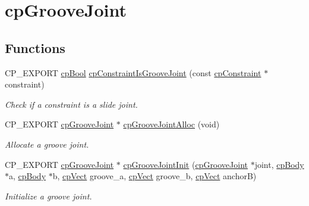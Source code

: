\hypertarget{group__cpGrooveJoint}{}\section{cp\+Groove\+Joint}
\label{group__cpGrooveJoint}
\subsection*{Functions}
\begin{DoxyCompactItemize}
\item 
\mbox{\label{group__cpGrooveJoint_ga0b3250fa615962f7d9f532dda991af44}} 
C\+P\+\_\+\+E\+X\+P\+O\+RT \hyperlink{group__basicTypes_gabc5e752c48f3449ca26ef413ecbd647e}{cp\+Bool} \hyperlink{group__cpGrooveJoint_ga0b3250fa615962f7d9f532dda991af44}{cp\+Constraint\+Is\+Groove\+Joint} (const \hyperlink{structcpConstraint}{cp\+Constraint} $\ast$constraint)
\begin{DoxyCompactList}\small\item\em Check if a constraint is a slide joint. \end{DoxyCompactList}\item 
\mbox{\label{group__cpGrooveJoint_ga3311473556166c68e77963c94c1ed601}} 
C\+P\+\_\+\+E\+X\+P\+O\+RT \hyperlink{structcpGrooveJoint}{cp\+Groove\+Joint} $\ast$ \hyperlink{group__cpGrooveJoint_ga3311473556166c68e77963c94c1ed601}{cp\+Groove\+Joint\+Alloc} (void)
\begin{DoxyCompactList}\small\item\em Allocate a groove joint. \end{DoxyCompactList}\item 
\mbox{\label{group__cpGrooveJoint_ga4d7e4663fde08cee80b706372d8001ab}} 
C\+P\+\_\+\+E\+X\+P\+O\+RT \hyperlink{structcpGrooveJoint}{cp\+Groove\+Joint} $\ast$ \hyperlink{group__cpGrooveJoint_ga4d7e4663fde08cee80b706372d8001ab}{cp\+Groove\+Joint\+Init} (\hyperlink{structcpGrooveJoint}{cp\+Groove\+Joint} $\ast$joint, \hyperlink{structcpBody}{cp\+Body} $\ast$a, \hyperlink{structcpBody}{cp\+Body} $\ast$b, \hyperlink{structcpVect}{cp\+Vect} groove\+\_\+a, \hyperlink{structcpVect}{cp\+Vect} groove\+\_\+b, \hyperlink{structcpVect}{cp\+Vect} anchorB)
\begin{DoxyCompactList}\small\item\em Initialize a groove joint. \end{DoxyCompactList}\item 

\end{DoxyCompactItemize}
